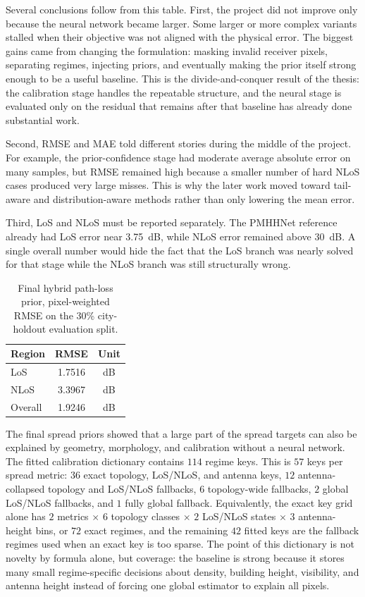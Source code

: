 Several conclusions follow from this table. First, the project did not improve
only because the neural network became larger. Some larger or more complex
variants stalled when their objective was not aligned with the physical error.
The biggest gains came from changing the formulation: masking invalid
receiver pixels, separating regimes, injecting priors, and eventually making
the prior itself strong enough to be a useful baseline. This is the
divide-and-conquer result of the thesis: the calibration stage handles the
repeatable structure, and the neural stage is evaluated only on the residual
that remains after that baseline has already done substantial work.

Second, RMSE and MAE told different stories during the middle of the project.
For example, the prior-confidence stage had moderate average absolute error on many samples, but
RMSE remained high because a smaller number of hard NLoS cases produced very
large misses. This is why the later work moved toward tail-aware and
distribution-aware methods rather than only lowering the mean error.

Third, LoS and NLoS must be reported separately. The PMHHNet reference already had LoS error
near \SI{3.75}{dB}, while NLoS error remained above \SI{30}{dB}. A single
overall number would hide the fact that the LoS branch was nearly solved for
that stage while the NLoS branch was still structurally wrong.

\begin{table}[H]
\centering
\caption{Final hybrid path-loss prior, pixel-weighted RMSE on the
30\% city-holdout evaluation split.}
\label{tab:try78_results}
\begin{tabular}{lcc}
\toprule
Region & RMSE & Unit \\
\midrule
LoS & 1.7516 & dB \\
NLoS & 3.3967 & dB \\
Overall & 1.9246 & dB \\
\bottomrule
\end{tabular}
\end{table}

The final spread priors showed that a large part of the spread targets can also be explained by
geometry, morphology, and calibration without a neural network. The fitted
calibration dictionary contains \(114\) regime keys. This is \(57\) keys per
spread metric: \(36\) exact topology, LoS/NLoS, and antenna keys, \(12\)
antenna-collapsed topology and LoS/NLoS fallbacks, \(6\) topology-wide fallbacks,
\(2\) global LoS/NLoS fallbacks, and \(1\) fully global fallback. Equivalently,
the exact key grid alone has \(2\) metrics \(\times\) \(6\) topology classes
\(\times\) \(2\) LoS/NLoS states \(\times\) \(3\) antenna-height bins, or
\(72\) exact regimes, and the remaining \(42\) fitted keys are the fallback
regimes used when an exact key is too sparse.
The point of this dictionary is not novelty by formula alone, but coverage: the
baseline is strong because it stores many small regime-specific decisions about
density, building height, visibility, and antenna height instead of forcing one
global estimator to explain all pixels.

